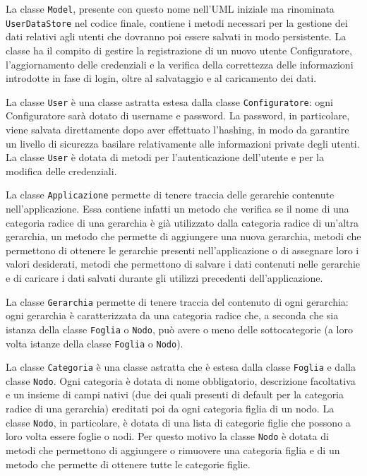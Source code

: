 La classe \texttt{Model}, presente con questo nome nell'UML iniziale ma rinominata \texttt{UserDataStore} nel codice finale, contiene i metodi necessari per la gestione dei dati relativi agli utenti che dovranno poi essere salvati in modo persistente. La classe ha il compito di gestire la registrazione di un nuovo utente Configuratore, l'aggiornamento delle credenziali e la verifica della correttezza delle informazioni introdotte in fase di login, oltre al salvataggio e al caricamento dei dati. 

La classe \texttt{User} è una classe astratta estesa dalla classe \texttt{Configuratore}: ogni Configuratore sarà dotato di username e password. La password, in particolare, viene salvata direttamente dopo aver effettuato l'hashing, in modo da garantire un livello di sicurezza basilare relativamente alle informazioni private degli utenti. La classe \texttt{User} è dotata di metodi per l'autenticazione dell'utente e per la modifica delle credenziali.

La classe \texttt{Applicazione} permette di tenere traccia delle gerarchie contenute nell'applicazione. 
Essa contiene infatti un metodo che verifica se il nome di una categoria radice di una gerarchia è già utilizzato dalla categoria radice di un'altra gerarchia, un metodo che permette di aggiungere una nuova gerarchia, metodi che permettono di ottenere le gerarchie presenti nell'applicazione o di assegnare loro i valori desiderati, metodi che permettono di salvare i dati contenuti nelle gerarchie e di caricare i dati salvati durante gli utilizzi precedenti dell'applicazione.

La classe \texttt{Gerarchia} permette di tenere traccia del contenuto di ogni gerarchia: ogni gerarchia è caratterizzata da una categoria radice che, a seconda che sia istanza della classe \texttt{Foglia} o \texttt{Nodo}, può avere o meno delle sottocategorie (a loro volta istanze della classe \texttt{Foglia} o \texttt{Nodo}). 

La classe \texttt{Categoria} è una classe astratta che è estesa dalla classe \texttt{Foglia} e dalla classe \texttt{Nodo}. Ogni categoria è dotata di nome obbligatorio, descrizione facoltativa e un insieme di campi nativi (due dei quali presenti di default per la categoria radice di una gerarchia) ereditati poi da ogni categoria figlia di un nodo.
La classe \texttt{Nodo}, in particolare, è dotata di una lista di categorie figlie che possono a loro volta essere foglie o nodi. Per questo motivo la classe \texttt{Nodo} è dotata di metodi che permettono di aggiungere o rimuovere una categoria figlia e di un metodo che permette di ottenere tutte le categorie figlie.

